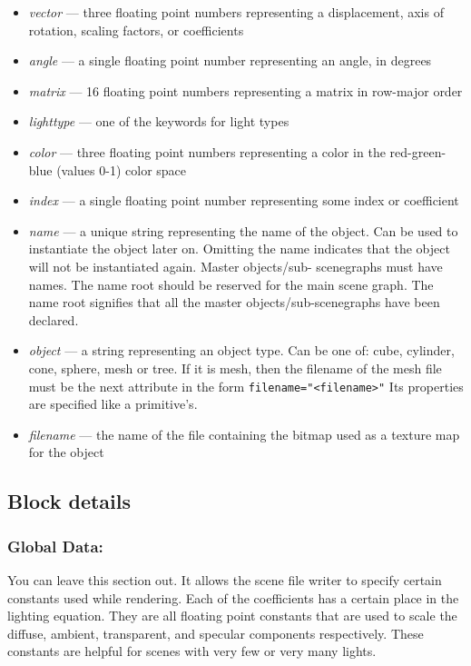 \documentclass{scrartcl}
\begin{document}
\begin{itemize}
\item \emph{vector} ---  three floating point numbers representing a displacement, axis of rotation, scaling factors, or
coefficients
\item \emph{angle} --- a single floating point number representing an angle, in degrees
\item \emph{matrix} --- 16 floating point numbers representing a matrix in row-major order
\item \emph{lighttype} --- one of the keywords for light types
\item \emph{color} --- three floating point numbers representing a color in the red-green-blue (values 0-1) color space
\item \emph{index} --- a single floating point number representing some index or coefficient
\item \emph{name} --- a unique string representing the name of the object. Can be used to instantiate the object later
on. Omitting the name indicates that the object will not be instantiated again. Master objects/sub-
scenegraphs must have names. The name root should be reserved for the main scene graph. The name
root signifies that all the master objects/sub-scenegraphs have been declared.
\item \emph{object} --- a string representing an object type. Can be one of: cube, cylinder, cone, sphere, mesh
or tree. If it is mesh, then the filename of the mesh file must be the next attribute in the form
\texttt{filename="<filename>"} Its properties are specified like a primitive's.
\item \emph{filename} --- the name of the file containing the bitmap used as a texture map for the object
\end{itemize}
\subsection*{Block details}
\subsubsection*{Global Data:}
You can leave this section out. It allows the scene file writer to specify certain constants used while
rendering. Each of the coefficients has a certain place in the lighting equation. They are all floating point
constants that are used to scale the diffuse, ambient, transparent, and specular components respectively.
These constants are helpful for scenes with very few or very many lights.
\end{document}
